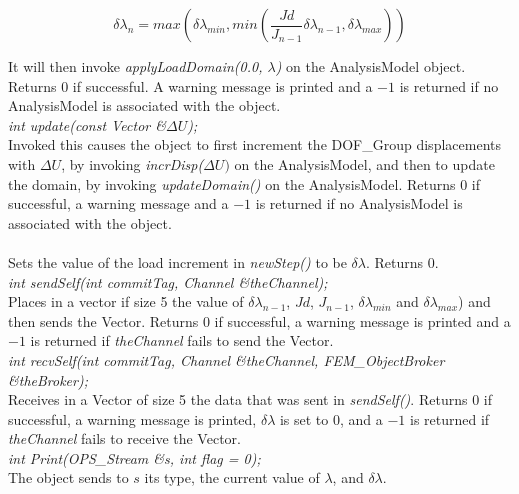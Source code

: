 \[ 
\delta \lambda_n = max \left( \delta \lambda_{min}, min \left(
\frac{Jd}{J_{n-1}} \delta \lambda_{n-1}, \delta \lambda_{max} \right) \right)
\]

\noindent It will then invoke
{\em applyLoadDomain(0.0, $\lambda$)} on the AnalysisModel
object. Returns $0$ if successful. A warning message is printed and a
$-1$ is returned if no AnalysisModel is associated with the object. \\

{\em int update(const Vector \&$\Delta U$);} \\
Invoked this causes the object to first increment the DOF\_Group
displacements with $\Delta U$, by invoking {\em incrDisp($\Delta U)$}
on the AnalysisModel, and then to update the domain, by invoking {\em
updateDomain()} on the AnalysisModel. Returns $0$ if successful, a
warning message and a $-1$ is returned if no AnalysisModel is
associated with the object. \\


 \\
Sets the value of the load increment in {\em newStep()} to be $\delta
\lambda$. Returns $0$.\\

{\em int sendSelf(int commitTag, Channel \&theChannel); } \\ 
Places in a vector if size 5 the value of $\delta \lambda_{n-1}$,
$Jd$, $J_{n-1}$, $\delta \lambda_{min}$ and $\delta \lambda_{max}$)
and then sends the Vector. Returns $0$ if successful, a warning
message is printed and a $-1$ is returned if {\em theChannel} fails to
send the Vector. \\ 

{\em int recvSelf(int commitTag, Channel \&theChannel, 
FEM\_ObjectBroker \&theBroker); } \\ 
Receives in a Vector of size 5 the data that was sent in {\em sendSelf()}.
Returns $0$ if successful, a warning message is printed, $\delta
\lambda$ is set to $0$, and a $-1$ is returned if {\em theChannel} 
fails to receive the Vector.\\

{\em int Print(OPS\_Stream \&s, int flag = 0);}\\
The object sends to $s$ its type, the current value of $\lambda$, and
$\delta \lambda$. 